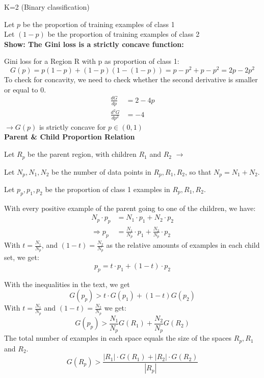 \begin{answer}

    K=2 (Binary classification)

Let $p$ be the proportion of training examples of class 1 \\
Let $(1-p)$ be the proportion of training examples of class 2 \\

\textbf{Show: The Gini loss is a strictly concave function:}

Gini loss for a Region R with p as proportion of class 1:
\[ G(p) = p(1-p) + (1-p)(1-(1-p)) = p-p^2+p-p^2 = 2p-2p^2 \]
To check for concavity, we need to check whether the second derivative is smaller or equal to 0.
\begin{align*}
    \frac{dG}{dp} &= 2-4p \\
    \frac{d^2 G}{dp^2} &= -4
\end{align*}
$\rightarrow G(p)$ is strictly concave for $p \in (0,1)$ \\

\textbf{Parent \& Child Proportion Relation}

Let $R_p$ be the parent region, with children $R_1$ and $R_2$
$\rightarrow$ 

Let $N_p, N_1, N_2$ be the number of data points in $R_p, R_1, R_2$, so that $N_p = N_1 + N_2$.

Let $p_p, p_1, p_2$ be the proportion of class 1 examples in $R_p, R_1, R_2$.

With every positive example of the parent going to one of the children, we have:
\begin{align*}
    N_p \cdot p_p &= N_1 \cdot p_1 + N_2 \cdot p_2 \\
    \Rightarrow p_p &= \frac{N_1}{N_p} \cdot p_1 + \frac{N_2}{N_p} \cdot p_2
\end{align*}
With $t = \frac{N_1}{N_p}$, and $(1-t) = \frac{N_2}{N_p}$ as the relative amounts of examples in each child set, we get:
\[ p_p = t \cdot p_1 + (1-t) \cdot p_2 \]

With the inequalities in the text, we get
\[ G(p_p) > t \cdot G(p_1) + (1-t) G(p_2) \]
With $t=\frac{N_1}{N_p}$ and $(1-t)=\frac{N_2}{N_p}$ we get:
\[ G(p_p) > \frac{N_1}{N_p} G(R_1) + \frac{N_2}{N_p} G(R_2) \]
The total number of examples in each space equals the size of the spaces $R_p, R_1$ and $R_2$.
\[ G(R_p) > \frac{|R_1| \cdot G(R_1) + |R_2| \cdot G(R_2)}{|R_p|} \]
\end{answer}